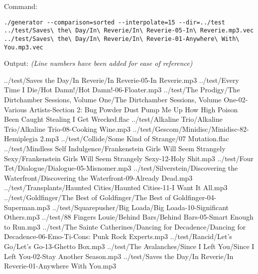 Command:
\begin{verbatim}
./generator --comparison=sorted --interpolate=15 --dir=../test ../test/Saves\ the\ Day/In\ Reverie/In\ Reverie-05-In\ Reverie.mp3.vec ../test/Saves\ the\ Day/In\ Reverie/In\ Reverie-01-Anywhere\ With\ You.mp3.vec
\end{verbatim}
Output: \small \emph{(Line numbers have been added for ease of reference)}
\begin{listing}{1}
../test/Saves the Day/In Reverie/In Reverie-05-In Reverie.mp3
../test/Every Time I Die/Hot Damn!/Hot Damn!-06-Floater.mp3
../test/The Prodigy/The Dirtchamber Sessions, Volume One/The Dirtchamber Sessions, Volume One-02-Various Artists-Section 2: Bug Powder Dust  Pump Me Up  How High  Poison  Been Caught Stealing  I Get Wrecked.flac
../test/Alkaline Trio/Alkaline Trio/Alkaline Trio-08-Cooking Wine.mp3
../test/Gescom/Minidisc/Minidisc-82-Hemiplegia 2.mp3
../test/Collide/Some Kind of Strange/07 Mutation.flac
../test/Mindless Self Indulgence/Frankenstein Girls Will Seem Strangely Sexy/Frankenstein Girls Will Seem Strangely Sexy-12-Holy Shit.mp3
../test/Four Tet/Dialogue/Dialogue-05-Misnomer.mp3
../test/Silverstein/Discovering the Waterfront/Discovering the Waterfront-09-Already Dead.mp3
../test/Transplants/Haunted Cities/Haunted Cities-11-I Want It All.mp3
../test/Goldfinger/The Best of Goldfinger/The Best of Goldfinger-04-Superman.mp3
../test/Squarepusher/Big Loada/Big Loada-10-Significant Others.mp3
../test/88 Fingers Louie/Behind Bars/Behind Bars-05-Smart Enough to Run.mp3
../test/The Sainte Catherines/Dancing for Decadence/Dancing for Decadence-06-Emo-Ti-Cons: Punk Rock Experts.mp3
../test/Rancid/Let's Go/Let's Go-13-Ghetto Box.mp3
../test/The Avalanches/Since I Left You/Since I Left You-02-Stay Another Season.mp3
../test/Saves the Day/In Reverie/In Reverie-01-Anywhere With You.mp3
\end{listing}

